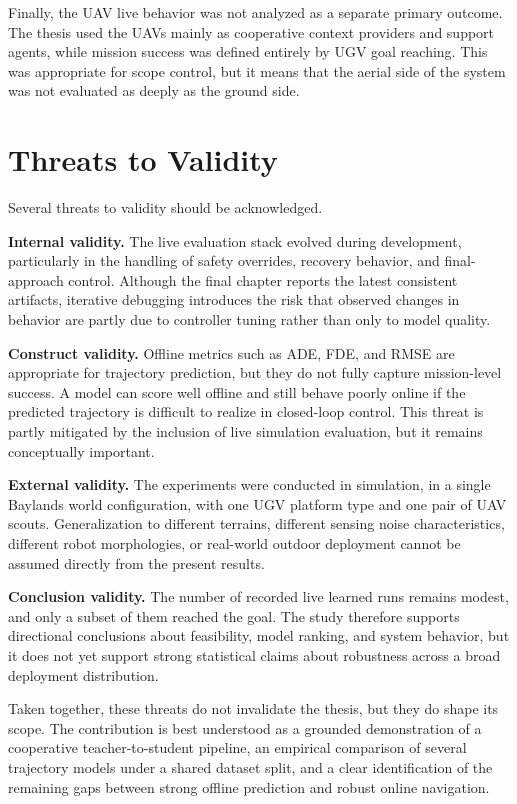 Finally, the UAV live behavior was not analyzed as a separate primary outcome. The thesis used the UAVs mainly as cooperative context providers and support agents, while mission success was defined entirely by UGV goal reaching. This was appropriate for scope control, but it means that the aerial side of the system was not evaluated as deeply as the ground side.

\section{Threats to Validity}

Several threats to validity should be acknowledged.

\textbf{Internal validity.} The live evaluation stack evolved during development, particularly in the handling of safety overrides, recovery behavior, and final-approach control. Although the final chapter reports the latest consistent artifacts, iterative debugging introduces the risk that observed changes in behavior are partly due to controller tuning rather than only to model quality.

\textbf{Construct validity.} Offline metrics such as ADE, FDE, and RMSE are appropriate for trajectory prediction, but they do not fully capture mission-level success. A model can score well offline and still behave poorly online if the predicted trajectory is difficult to realize in closed-loop control. This threat is partly mitigated by the inclusion of live simulation evaluation, but it remains conceptually important.

\textbf{External validity.} The experiments were conducted in simulation, in a single Baylands world configuration, with one UGV platform type and one pair of UAV scouts. Generalization to different terrains, different sensing noise characteristics, different robot morphologies, or real-world outdoor deployment cannot be assumed directly from the present results.

\textbf{Conclusion validity.} The number of recorded live learned runs remains modest, and only a subset of them reached the goal. The study therefore supports directional conclusions about feasibility, model ranking, and system behavior, but it does not yet support strong statistical claims about robustness across a broad deployment distribution.

Taken together, these threats do not invalidate the thesis, but they do shape its scope. The contribution is best understood as a grounded demonstration of a cooperative teacher-to-student pipeline, an empirical comparison of several trajectory models under a shared dataset split, and a clear identification of the remaining gaps between strong offline prediction and robust online navigation.
